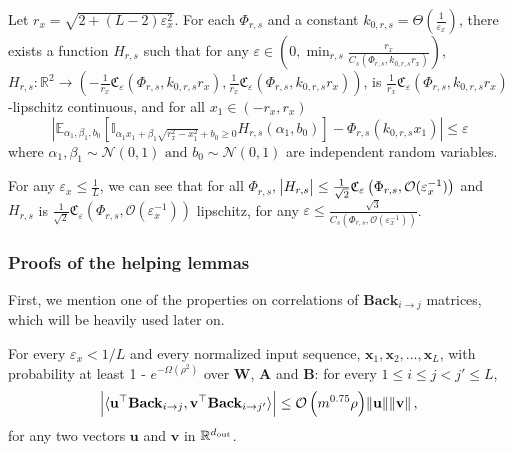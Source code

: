 \begin{lemma}\label{Def:Function_approx}
	Let $r_x = \sqrt{2 + (L-2)\varepsilon_x^2}$. For each $\Phi_{r, s}$ and a constant $k_{0, r, s} = \Theta(\frac{1}{\varepsilon_x})$, there exists a function $H_{r, s}$ such that for any $\varepsilon \in (0, \min_{r, s} \frac{r_x}{ C_s(\Phi_{r, s}, k_{0, r, s} r_x)})$,  $H_{r, s}:\mathbb{R}^2 \to \left(-\frac{1}{r_x} \mathfrak{C}_\varepsilon\left(\Phi_{r, s}, k_{0, r, s} r_x\right),\frac{1}{r_x} \mathfrak{C}_\varepsilon\left(\Phi_{r, s}, k_{0, r, s} r_x\right)\right)$, is $\frac{1}{r_x} \mathfrak{C}_\varepsilon\left(\Phi_{r, s},  k_{0, r, s} r_x\right)$-lipschitz continuous, and for all $x_1 \in (-r_x, r_x)$
	\begin{equation*}
		\left|\mathbb{E}_{\alpha_1, \beta_1, b_0}\left[\mathbb{I}_{\alpha_{1} x_{1}+\beta_{1} \sqrt{r_x^2 - x_{1}^{2}} + b_0   \geq 0} {H_{r, s}\left(\alpha_{1}, b_0\right)}\right]-\Phi_{r, s}\left(k_{0, r, s} x_{1} \right)\right| \leq \varepsilon
	\end{equation*}
	where $\alpha_1, \beta_1 \sim \mathcal{N}\left(0, 1\right) \text{ and } b_0 \sim \mathcal{N}\left(0, 1\right)$ are independent random variables.
\end{lemma}
For any $\varepsilon_x \le \frac{1}{L}$, we can see that for all $\Phi_{r, s}$,
$\abs{H_{r, s}} \le \frac{1}{\sqrt{2}} \mathfrak{C}_\varepsilon\left(\Phi_{r, s},  \mathcal{O}(\varepsilon_x^{-1})\right)$ and $H_{r, s}$ is $\frac{1}{\sqrt{2}} \mathfrak{C}_\varepsilon\left(\Phi_{r, s},  \mathcal{O}(\varepsilon_x^{-1})\right)$ lipschitz, for any $\varepsilon \le \frac{\sqrt{3}}{C_s(\Phi_{r, s}, \mathcal{O}(\varepsilon_x^{-1}))}$.





\subsubsection{Proofs of the helping lemmas}
First, we mention one of the properties on correlations of $\mathbf{Back}_{i \to j}$ matrices, which will be heavily used later on.
\begin{lemma}\label{lemma:backward_correlation}
	For every $\varepsilon_x < 1/L$ and every normalized input sequence, $\mathbf{x}_1, \mathbf{x}_2, ..., \mathbf{x}_{L}$, with probability at least 1 - $e^{-\Omega(\rho^2)}$ over $\mathbf{W}$, $\mathbf{A}$ and $\mathbf{B}$: for every $1 \le i \le j < j' \le L$, 
	\begin{equation*}
		\abs{\langle \mathbf{u}^{\top} \mathbf{Back}_{i \to j}, \mathbf{v}^{\top} \mathbf{Back}_{i \to j'} \rangle} \le \mathcal{O}\left(m^{0.75} \rho\right) \norm{\mathbf{u}} \norm{\mathbf{v}},
	\end{equation*}
	for any two vectors $\mathbf{u}$ and $\mathbf{v}$ in $\mathbb{R}^{d_{\mathrm{out}} }$.
\end{lemma}


